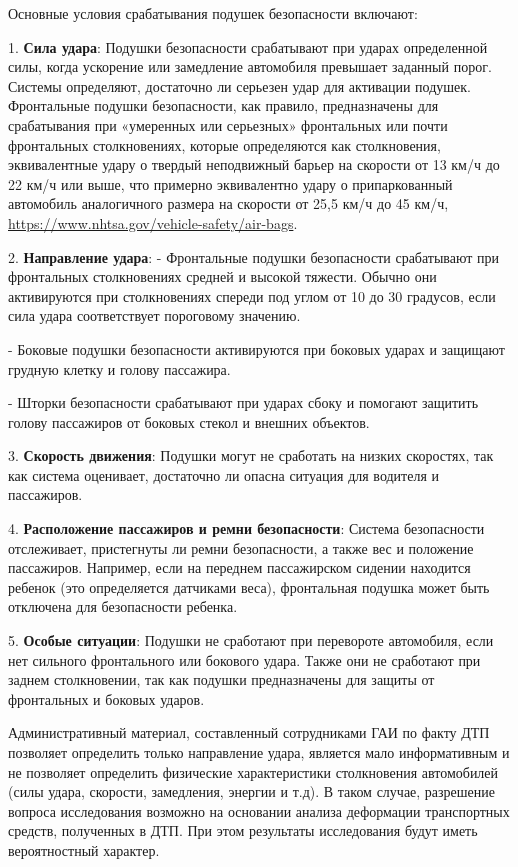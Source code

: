   Основные условия срабатывания подушек безопасности включают:

1. \textbf{Сила удара}: Подушки безопасности срабатывают при ударах определенной силы, когда ускорение или замедление автомобиля превышает заданный порог. Системы определяют, достаточно ли серьезен удар для активации подушек.  Фронтальные подушки безопасности, как правило, предназначены для срабатывания при «умеренных или серьезных» фронтальных или почти фронтальных столкновениях, которые определяются как столкновения, эквивалентные удару о твердый неподвижный барьер на скорости от 13 км/ч до 22 км/ч или выше, что примерно  эквивалентно удару о припаркованный автомобиль аналогичного размера на скорости от 25,5 км/ч до 45 км/ч, \url{https://www.nhtsa.gov/vehicle-safety/air-bags}.

2. \textbf{Направление удара}:
- Фронтальные подушки безопасности срабатывают при фронтальных столкновениях средней и высокой тяжести. Обычно они активируются при столкновениях спереди под углом от 10 до 30 градусов, если сила удара соответствует пороговому значению.

- Боковые подушки безопасности активируются при боковых ударах и защищают грудную клетку и голову пассажира.

- Шторки безопасности срабатывают при ударах сбоку и помогают защитить голову пассажиров от боковых стекол и внешних объектов.

3. \textbf{Скорость движения}: Подушки могут не сработать на низких скоростях, так как система оценивает, достаточно ли опасна ситуация для водителя и пассажиров.

4.\textbf{ Расположение пассажиров и ремни безопасности}: Система безопасности отслеживает, пристегнуты ли ремни безопасности, а также вес и положение пассажиров. Например, если на переднем пассажирском сидении находится ребенок (это определяется датчиками веса), фронтальная подушка может быть отключена для безопасности ребенка. 

5. \textbf{Особые ситуации}: Подушки не сработают при перевороте автомобиля, если нет сильного фронтального или бокового удара. Также они не сработают при заднем столкновении, так как подушки предназначены для защиты от фронтальных и боковых ударов.


Административный материал, составленный сотрудниками ГАИ по факту  ДТП позволяет определить только направление удара, является мало информативным и не позволяет  определить физические характеристики  столкновения автомобилей (силы удара, скорости, замедления, энергии и т.д). В таком случае,  разрешение вопроса исследования  возможно на основании анализа  деформации транспортных средств, полученных в ДТП. При этом результаты исследования будут иметь вероятностный характер.  



